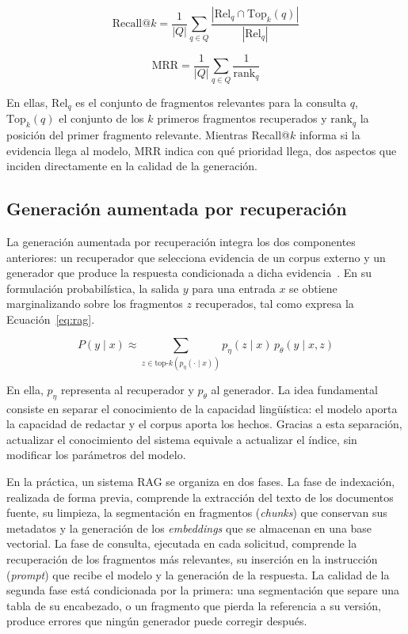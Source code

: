 \begin{equation}
\label{eq:recall}
\mathrm{Recall@}k = \frac{1}{|Q|} \sum_{q \in Q} \frac{|\mathrm{Rel}_q \cap \mathrm{Top}_k(q)|}{|\mathrm{Rel}_q|}
\end{equation}

\begin{equation}
\label{eq:mrr}
\mathrm{MRR} = \frac{1}{|Q|} \sum_{q \in Q} \frac{1}{\mathrm{rank}_q}
\end{equation}

En ellas, $\mathrm{Rel}_q$ es el conjunto de fragmentos relevantes para la consulta $q$, $\mathrm{Top}_k(q)$ el conjunto de los $k$ primeros fragmentos recuperados y $\mathrm{rank}_q$ la posición del primer fragmento relevante. Mientras Recall@$k$ informa si la evidencia llega al modelo, MRR indica con qué prioridad llega, dos aspectos que inciden directamente en la calidad de la generación.

\subsection{Generación aumentada por recuperación}
La generación aumentada por recuperación integra los dos componentes anteriores: un recuperador que selecciona evidencia de un corpus externo y un generador que produce la respuesta condicionada a dicha evidencia~\cite{lewis2020rag}. En su formulación probabilística, la salida $y$ para una entrada $x$ se obtiene marginalizando sobre los fragmentos $z$ recuperados, tal como expresa la Ecuación~\ref{eq:rag}.

\begin{equation}
\label{eq:rag}
P(y \mid x) \approx \sum_{z \in \mathrm{top}\text{-}k(p_\eta(\cdot \mid x))} p_\eta(z \mid x)\, p_\theta(y \mid x, z)
\end{equation}

En ella, $p_\eta$ representa al recuperador y $p_\theta$ al generador. La idea fundamental consiste en separar el conocimiento de la capacidad lingüística: el modelo aporta la capacidad de redactar y el corpus aporta los hechos. Gracias a esta separación, actualizar el conocimiento del sistema equivale a actualizar el índice, sin modificar los parámetros del modelo.

En la práctica, un sistema RAG se organiza en dos fases. La fase de indexación, realizada de forma previa, comprende la extracción del texto de los documentos fuente, su limpieza, la segmentación en fragmentos (\textit{chunks}) que conservan sus metadatos y la generación de los \textit{embeddings} que se almacenan en una base vectorial. La fase de consulta, ejecutada en cada solicitud, comprende la recuperación de los fragmentos más relevantes, su inserción en la instrucción (\textit{prompt}) que recibe el modelo y la generación de la respuesta. La calidad de la segunda fase está condicionada por la primera: una segmentación que separe una tabla de su encabezado, o un fragmento que pierda la referencia a su versión, produce errores que ningún generador puede corregir después.

